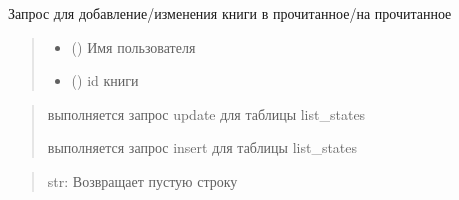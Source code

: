 \documentclass[letterpaper,10pt,russian]{sphinxmanual}
\begin{document}
\begin{fulllineitems}
\label{\detokenize{blueprints:blueprints.change_state.change_end_read}}
\pysigstartsignatures
{}
\pysigstopsignatures
\sphinxAtStartPar
Запрос для добавление/изменения книги в прочитанное/на прочитанное
\begin{quote}\begin{description}
\begin{itemize}
\item {} 
\sphinxAtStartPar
{} () \textendash{} Имя пользователя

\item {} 
\sphinxAtStartPar
{} () \textendash{} id книги

\end{itemize}

\end{description}\end{quote}
\begin{description}
\begin{quote}\begin{description}
\sphinxAtStartPar
выполняется запрос update для таблицы list\_states

\sphinxAtStartPar
выполняется запрос insert для таблицы list\_states

\end{description}\end{quote}

\end{description}
\begin{quote}\begin{description}
\sphinxAtStartPar
str: Возвращает пустую строку

\end{description}\end{quote}

\end{fulllineitems}
\end{document}
